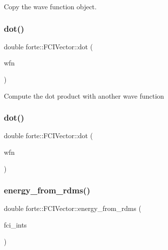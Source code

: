 Copy the wave function object. 

\mbox{\label{classforte_1_1_f_c_i_vector_a1cccfb3c677d313ba9bb278adc5d8dba}} 
\subsubsection{\texorpdfstring{dot()}{dot()}\hspace{0.1cm}{\footnotesize\ttfamily [1/2]}}
{\footnotesize\ttfamily double forte\+::\+F\+C\+I\+Vector\+::dot (\begin{DoxyParamCaption}\item[{\mbox{\hyperlink{classforte_1_1_f_c_i_vector}{F\+C\+I\+Vector}} \&}]{wfn }\end{DoxyParamCaption})}

Compute the dot product with another wave function \mbox{\label{classforte_1_1_f_c_i_vector_a5a80e78715a46d5edf2771e225dc8bcc}} 
\subsubsection{\texorpdfstring{dot()}{dot()}\hspace{0.1cm}{\footnotesize\ttfamily [2/2]}}
{\footnotesize\ttfamily double forte\+::\+F\+C\+I\+Vector\+::dot (\begin{DoxyParamCaption}\item[{std\+::shared\+\_\+ptr$<$ \mbox{\hyperlink{classforte_1_1_f_c_i_vector}{F\+C\+I\+Vector}} $>$ \&}]{wfn }\end{DoxyParamCaption})}

\mbox{\label{classforte_1_1_f_c_i_vector_a9c3afbd8ad81b943a19bb1cefbc50c2d}} 
\subsubsection{\texorpdfstring{energy\+\_\+from\+\_\+rdms()}{energy\_from\_rdms()}}
{\footnotesize\ttfamily double forte\+::\+F\+C\+I\+Vector\+::energy\+\_\+from\+\_\+rdms (\begin{DoxyParamCaption}\item[{std\+::shared\+\_\+ptr$<$ \mbox{\hyperlink{classforte_1_1_active_space_integrals}{Active\+Space\+Integrals}} $>$}]{fci\+\_\+ints }\end{DoxyParamCaption})}

